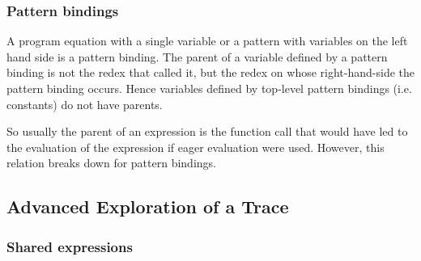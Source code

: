 \documentclass[12pt]{article}
\begin{document}
\subsubsection{Pattern bindings}

A program equation with a single variable or a pattern with variables
on the left hand side is a pattern binding. The parent of a variable
defined by a pattern binding is not the redex that called it, but
the redex on whose right-hand-side the pattern binding occurs. Hence
variables defined by top-level pattern bindings (i.e. constants)
do not have parents.

So usually the parent of an expression is the function call that
would have led to the evaluation of the expression if eager evaluation
were used.  However, this relation breaks down for pattern bindings.



\subsection{Advanced Exploration of a Trace}

%
%
%
%

\subsubsection{Shared expressions}
\end{document}
